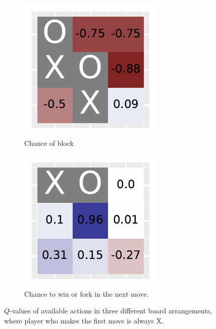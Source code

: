 \documentclass[10pt]{IEEEtran}
\begin{document}
\begin{figure}[H]
\begin{subfigure}[b]{0.32\linewidth}
         \includegraphics[width=\linewidth]{code/figures/heatmap_1.pdf}
         \caption{Chance of block}
         \label{fig_heatmap_2}
     \end{subfigure}
     \hfill
     \begin{subfigure}[b]{0.32\linewidth}
         \centering
         \includegraphics[width=\linewidth]{code/figures/heatmap_2.pdf}
         \caption{Chance to win or fork in the next move.}
         \label{fig_heatmap_3}
     \end{subfigure}
        \caption{$Q$-values of available actions in three different board arrangements, where player who makes the first move is always X.}
        \label{plot_question_10}
\end{figure}
\end{document}

